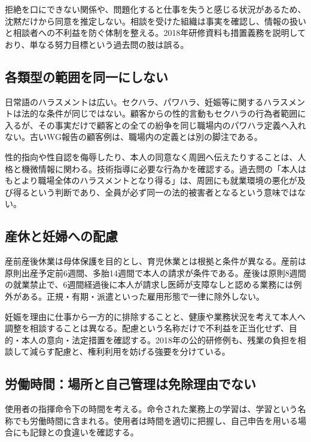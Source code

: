 拒絶を口にできない関係や、問題化すると仕事を失うと感じる状況があるため、沈黙だけから同意を推定しない。相談を受けた組織は事実を確認し、情報の扱いと相談者への不利益を防ぐ体制を整える。2018年研修資料も措置義務を説明しており、単なる努力目標という過去問の肢は誤る\parencite{employment_sexual2018}。

\subsection{各類型の範囲を同一にしない}
\label{theory:employment:scope}
日常語のハラスメントは広い。セクハラ、パワハラ、妊娠等に関するハラスメントは法的な条件が同じではない。顧客からの性的言動もセクハラの行為者範囲に入るが、その事実だけで顧客との全ての紛争を同じ職場内のパワハラ定義へ入れない。古いWG報告の顧客例は、職場内の定義とは別の脚注である。

性的指向や性自認を侮辱したり、本人の同意なく周囲へ伝えたりすることは、人格と機微情報に関わる。技術指導に必要な行為かを確認する。過去問の「本人はもとより職場全体のハラスメントとなり得る」は、周囲にも就業環境の悪化が及び得るという判断であり、全員が必ず同一の法的被害者となるという意味ではない。

\subsection{産休と妊婦への配慮}
\label{theory:employment:maternity}
産前産後休業は母体保護を目的とし、育児休業とは根拠と条件が異なる。産前は原則出産予定前6週間、多胎14週間で本人の請求が条件である。産後は原則8週間の就業禁止で、6週間経過後に本人が請求し医師が支障なしと認める業務には例外がある。正規・有期・派遣といった雇用形態で一律に除外しない\parencite{employment_maternity2014,employment_maternity_current}。

妊娠を理由に仕事から一方的に排除することと、健康や業務状況を考えて本人へ調整を相談することは異なる。配慮という名称だけで不利益を正当化せず、目的・本人の意向・法定措置を確認する。2018年の公的研修例も、残業の負担を相談して減らす配慮と、権利利用を妨げる強要を分けている。

\subsection{労働時間：場所と自己管理は免除理由でない}
\label{theory:employment:worktime}
使用者の指揮命令下の時間を考える。命令された業務上の学習は、学習という名称でも労働時間に含まれる。使用者は時間を適切に把握し、自己申告を用いる場合にも記録との食違いを確認する\parencite{employment_hours2017}。

